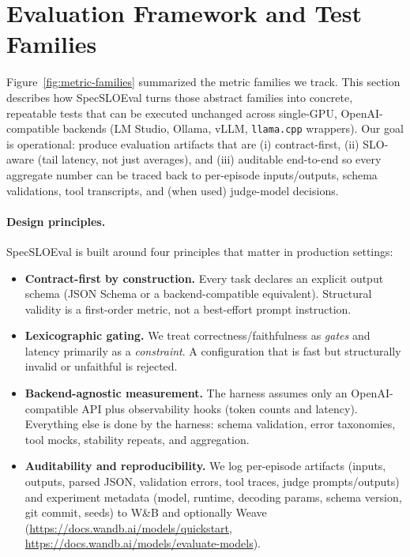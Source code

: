 \section{Evaluation Framework and Test Families}
\label{sec:eval-framework}

Figure~\ref{fig:metric-families} summarized the metric families we track.
This section describes how SpecSLOEval turns those abstract families into concrete, repeatable tests that can be executed unchanged across single-GPU, OpenAI-compatible backends (LM Studio, Ollama, vLLM, \texttt{llama.cpp} wrappers).
Our goal is operational: produce evaluation artifacts that are (i) contract-first, (ii) SLO-aware (tail latency, not just averages), and (iii) auditable end-to-end so every aggregate number can be traced back to per-episode inputs/outputs, schema validations, tool transcripts, and (when used) judge-model decisions.

\paragraph{Design principles.}
SpecSLOEval is built around four principles that matter in production settings:

\begin{itemize}[leftmargin=12pt]
    \item \textbf{Contract-first by construction.} Every task declares an explicit output schema (JSON Schema or a backend-compatible equivalent). Structural validity is a first-order metric, not a best-effort prompt instruction.
    \item \textbf{Lexicographic gating.} We treat correctness/faithfulness as \emph{gates} and latency primarily as a \emph{constraint}. A configuration that is fast but structurally invalid or unfaithful is rejected.
    \item \textbf{Backend-agnostic measurement.} The harness assumes only an OpenAI-compatible API plus observability hooks (token counts and latency). Everything else is done by the harness: schema validation, error taxonomies, tool mocks, stability repeats, and aggregation.
    \item \textbf{Auditability and reproducibility.} We log per-episode artifacts (inputs, outputs, parsed JSON, validation errors, tool traces, judge prompts/outputs) and experiment metadata (model, runtime, decoding params, schema version, git commit, seeds) to W\&B and optionally Weave (\url{https://docs.wandb.ai/models/quickstart}, \url{https://docs.wandb.ai/models/evaluate-models}).
\end{itemize}

